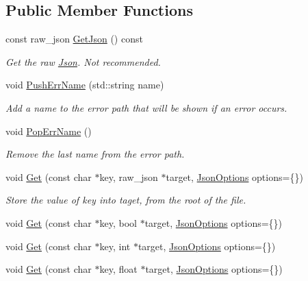 \subsection*{Public Member Functions}
\begin{DoxyCompactItemize}
\item 
\mbox{\label{classTarbora_1_1Json_ab0909a1bb3d5051a0742c3ee0f90c639}} 
const raw\+\_\+json \hyperlink{classTarbora_1_1Json_ab0909a1bb3d5051a0742c3ee0f90c639}{Get\+Json} () const
\begin{DoxyCompactList}\small\item\em Get the raw \hyperlink{classTarbora_1_1Json}{Json}. Not recommended. \end{DoxyCompactList}\item 
void \hyperlink{classTarbora_1_1Json_a061eac4f16dac3b9b3a26a66de0ea8f0}{Push\+Err\+Name} (std\+::string name)
\begin{DoxyCompactList}\small\item\em Add a name to the error path that will be shown if an error occurs. \end{DoxyCompactList}\item 
void \hyperlink{classTarbora_1_1Json_a14019f06d3bd76edd6a6e78134519d11}{Pop\+Err\+Name} ()
\begin{DoxyCompactList}\small\item\em Remove the last name from the error path. \end{DoxyCompactList}\item 
void \hyperlink{classTarbora_1_1Json_a6767cba370c056964e4701ee7d5bab0b}{Get} (const char $\ast$key, raw\+\_\+json $\ast$target, \hyperlink{structTarbora_1_1JsonOptions}{Json\+Options} options=\{\})
\begin{DoxyCompactList}\small\item\em Store the value of {\itshape key} into {\itshape taget}, from the root of the file. \end{DoxyCompactList}\item 
void \hyperlink{classTarbora_1_1Json_ad3ff74537c4cb9c9747006a4d04079b4}{Get} (const char $\ast$key, bool $\ast$target, \hyperlink{structTarbora_1_1JsonOptions}{Json\+Options} options=\{\})
\item 
void \hyperlink{classTarbora_1_1Json_aeff932d4aebb4a9986af07f9cad26f81}{Get} (const char $\ast$key, int $\ast$target, \hyperlink{structTarbora_1_1JsonOptions}{Json\+Options} options=\{\})
\item 
void \hyperlink{classTarbora_1_1Json_a41659cc0b54206ba4a6594cc9f90c3e4}{Get} (const char $\ast$key, float $\ast$target, \hyperlink{structTarbora_1_1JsonOptions}{Json\+Options} options=\{\})

\end{DoxyCompactItemize}
